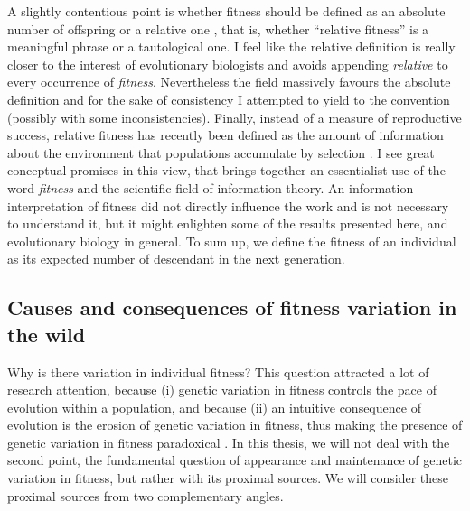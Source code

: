 A slightly contentious point is whether fitness should be defined as an absolute number of offspring \parencite{Wade2006} or a relative one \parencite{Rousset2004}, that is, whether ``relative fitness'' is a meaningful phrase or a tautological one. I feel like the relative definition is really closer to the interest of evolutionary biologists and avoids appending \emph{relative} to every occurrence of \emph{fitness}. Nevertheless the field massively favours the absolute definition and for the sake of consistency I attempted to yield to the convention (possibly with some inconsistencies). 
Finally, instead of a measure of reproductive success, relative fitness has recently been defined as the amount of information about the environment that populations accumulate by selection \parencite{Frank2012V}. I see great conceptual promises in this view, that brings together an essentialist use of the word \emph{fitness} and the scientific field of information theory. An information interpretation of fitness did not directly influence the work and is not necessary to understand it, but it might enlighten some of the results presented here, and evolutionary biology in general.
To sum up, we define the fitness of an individual as its expected number of descendant in the next generation.

\subsection{Causes and consequences of fitness variation in the wild}
Why is there variation in individual fitness? This question attracted a lot of research attention, because (i) genetic variation in fitness controls the pace of evolution within a population, and because (ii) an intuitive consequence of evolution is the erosion of genetic variation in fitness, thus making the presence of genetic variation in fitness paradoxical \parencite{Jones1987}. 
In this thesis, we will not deal with the second point, the fundamental question of appearance and maintenance of genetic variation in fitness, but rather with its proximal sources.
We will consider these proximal sources from two complementary angles. 

